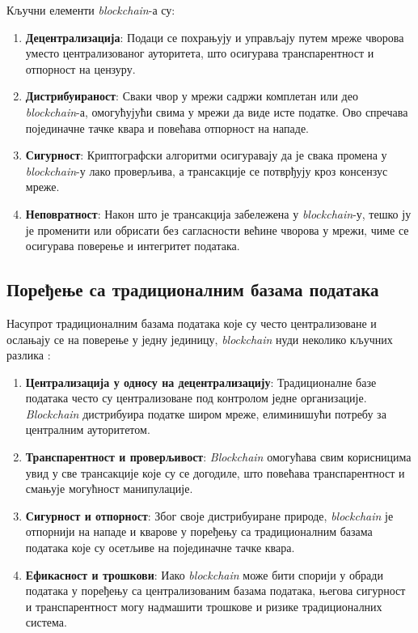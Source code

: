 \documentclass[12pt, a4paper]{article}
\begin{document}
Кључни елементи \textit{blockchain}-а су:
\begin{enumerate}
    \item \textbf{Децентрализација}: Подаци се похрањују и управљају путем мреже чворова уместо централизованог ауторитета, што осигурава транспарентност и отпорност на цензуру.
    \item  \textbf{Дистрибуираност}: Сваки чвор у мрежи садржи комплетан или део \textit{blockchain}-а, омогућујући свима у мрежи да виде исте податке. Ово спречава појединачне тачке квара и повећава отпорност на нападе.
    \item \textbf{Сигурност}: Криптографски алгоритми осигуравају да је свака промена у \textit{blockchain}-у лако проверљива, а трансакције се потврђују кроз консензус мреже.
    \item \textbf{Неповратност}: Након што је трансакција забележена у \textit{blockchain}-у, тешко ју је променити или обрисати без сагласности већине чворова у мрежи, чиме се осигурава поверење и интегритет података.
\end{enumerate}


\subsection{Поређење са традиционалним базама података}
Насупрот традиционалним базама података које су често централизоване и ослањају се на поверење у једну јединицу, \textit{blockchain} нуди неколико кључних разлика \cite{9}:
\begin{enumerate}
    \item \textbf{Централизација у односу на децентрализацију}: Традиционалне базе података често су централизоване под контролом једне организације. \textit{Blockchain} дистрибуира податке широм мреже, елиминишући потребу за централним ауторитетом.
    \item \textbf{Транспарентност и проверљивост}: \textit{Blockchain} омогућава свим корисницима увид у све трансакције које су се догодиле, што повећава транспарентност и смањује могућност манипулације.
    \item \textbf{Сигурност и отпорност}: Због своје дистрибуиране природе, \textit{blockchain} је отпорнији на нападе и кварове у поређењу са традиционалним базама података које су осетљиве на појединачне тачке квара.
    \item \textbf{Ефикасност и трошкови}: Иако \textit{blockchain} може бити спорији у обради података у поређењу са централизованим базама података, његова сигурност и транспарентност могу надмашити трошкове и ризике традиционалних система.
\end{enumerate}
\end{document}
